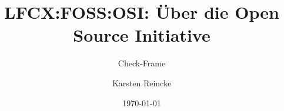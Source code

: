 \documentclass[]{beamer}
\title{LFCX:FOSS:OSI: Über die Open Source Initiative}
\subtitle{Check-Frame}
\institute{GS-LDK}
\author{Karsten Reincke}
\date{\today}
\def\cfgGl{../../../../cfg.gl/}
\begin{document}

\begin{frame}
  \titlepage
\end{frame}






\logo{}
\newpage



%
\end{document}
